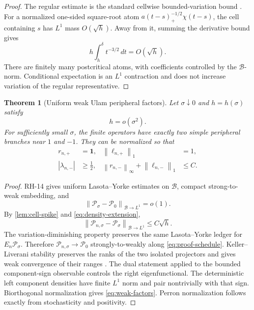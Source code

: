 \documentclass[11pt]{article}
\newtheorem{theorem}{Theorem}[section]
\theoremstyle{remark}
\newcommand{\cB}{\mathcal B}
\newcommand{\cP}{\mathcal P}
\newcommand{\norm}[1]{\left\lVert #1\right\rVert}
\begin{document}
\begin{proof}
The regular estimate is the standard cellwise bounded-variation bound
\citep{Li1976,BoyarskyGora1997}.  For a normalized one-sided
square-root atom \(a(t-s)_+^{-1/2}\chi(t-s)\), the cell containing \(s\)
has \(L^1\) mass \(O(\sqrt h)\).  Away from it, summing the derivative
bound gives
\[
 h\int_h^\delta t^{-3/2}\,dt=O(\sqrt h).
\]
There are finitely many postcritical atoms, with coefficients controlled
by the \(\cB\)-norm.  Conditional expectation is an \(L^1\) contraction
and does not increase variation of the regular representative.
\end{proof}

\begin{theorem}[Uniform weak Ulam peripheral factors]
\label{thm:weak-factors}
Let \(\sigma\downarrow0\) and \(h=h(\sigma)\) satisfy
\begin{equation}
 h=o(\sigma^2).
 \label{eq:proof-schedule}
\end{equation}
For sufficiently small \(\sigma\), the finite operators have exactly two
simple peripheral branches near \(1\) and \(-1\).  They can be normalized
so that
\begin{align}
 r_{n,+}&=\mathbf1,&\norm{\ell_{n,+}}_1&=1,\\
 |\lambda_{n,-}|&\ge\frac12,&
 \norm{r_{n,-}}_\infty+\norm{\ell_{n,-}}_1&\le C.
 \label{eq:weak-factors}
\end{align}
\end{theorem}

\begin{proof}
RH-14 gives uniform Lasota--Yorke estimates on \(\cB\), compact
strong-to-weak embedding, and
\[
 \norm{\cP_\sigma-\cP_0}_{\cB\to L^1}=o(1).
\]
By \cref{lem:cell-spike} and \eqref{eq:density-extension},
\[
 \norm{\cP_{n,\sigma}-\cP_\sigma}_{\cB\to L^1}
 \le C\sqrt h.
\]
The variation-diminishing property preserves the same Lasota--Yorke ledger
for \(E_n\cP_\sigma\).  Therefore
\(\cP_{n,\sigma}\to\cP_0\) strongly-to-weakly along
\eqref{eq:proof-schedule}.  Keller--Liverani stability preserves the ranks
of the two isolated projectors and gives weak convergence of their ranges
\citep{KellerLiverani1999}.  The dual statement applied to the bounded
component-sign observable controls the right eigenfunctional.  The
deterministic left component densities have finite \(L^1\) norm and pair
nontrivially with that sign.  Biorthogonal normalization gives
\eqref{eq:weak-factors}.  Perron normalization follows exactly from
stochasticity and positivity.
\end{proof}
\end{document}
